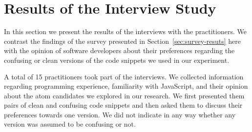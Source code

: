 

\section{Results of the Interview Study}
\label{sec:interview-results}

In this section we present the results of the interviews with the practitioners. 
We contrast the findings of the survey presented in Section~\ref{sec:survey-resuts} here with the opinion
of software developers about their preferences regarding the confusing
or clean versions of the code snippets we used in our experiment. 




A total of 15 practitioners took part of the interviews.
We collected information regarding programming
experience, familiarity with JavaScript, and their opinion about the \na atom candidates we explored in our research. We first presented them pairs of clean and confusing code snippets and then asked them to discuss their preferences towards one version. We did not indicate in any way whether any version was assumed to be confusing or not. 



